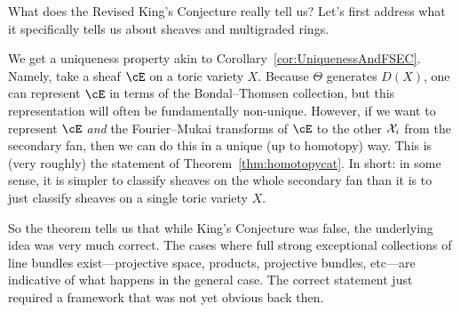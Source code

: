 \documentclass{amsart}
\begin{document}
\begin{remark}\label{rmk:WhatIsRevisedKingsConjectureAbout}
What does the Revised King's Conjecture really tell us?  Let's first address what it specifically tells us about sheaves and multigraded rings.

We get a uniqueness property akin to Corollary~\ref{cor:UniquenessAndFSEC}.  Namely, take a sheaf $\cE$ on a toric variety $X$.  Because $\Theta$ generates $D(X)$, one can represent $\cE$ in terms of the Bondal--Thomsen collection, but this representation will often be fundamentally non-unique.  However, if we want to represent $\cE$ \emph{and} the Fourier--Mukai transforms of $\cE$ to the other $\mathcal X_i$ from the secondary fan, then we can do this in a unique (up to homotopy) way.  This is (very roughly) the statement of Theorem~\ref{thm:homotopycat}.  In short: in some sense, it is simpler to classify sheaves on the whole secondary fan than it is to just classify sheaves on a single toric variety $X$.

So the theorem tells us that while King's Conjecture was false, the underlying idea was very much correct.  The cases where full strong exceptional collections of line bundles exist---projective space, products, projective bundles, etc---are indicative of what happens in the general case.  The correct statement just required a framework that was not yet obvious back then.
\end{remark}

\ifdefined\whole
\else


\end{document}
